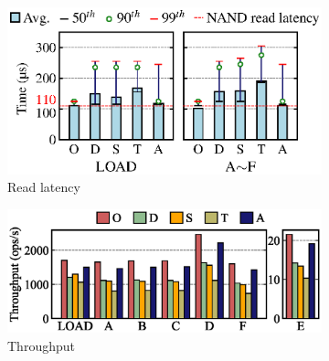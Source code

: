 \begin{figure}[t]
	\begin{minipage}[c]{0.622\textwidth}
        \begin{subfigure}[b]{0.45\textwidth}
            \centering
            \includegraphics[width=\textwidth]{exp/swap/swap-latency.eps}
            \vspace{-13pt}
   	        \caption{Read latency}
            \label{fig:swap-latency}
        \end{subfigure}
        \begin{subfigure}[b]{0.51\textwidth}
            \centering
            \vspace{0pt}
            \includegraphics[width=\textwidth]{exp/swap/new_SWAP_throughput.eps}
            \vspace{-1pt}
            \caption{Throughput} 
            \label{fig:swap-throughput}
        \end{subfigure}
        \vspace{-10pt}
	    \caption{Experimental results of YCSB benchmark}
	    \label{fig:exp-swap}
	    \vspace{-15pt}
	\end{minipage}
	\begin{minipage}[c]{0.368\textwidth}
        \begin{subfigure}[b]{0.52\textwidth}

\end{subfigure}
\end{minipage}
\end{figure}
